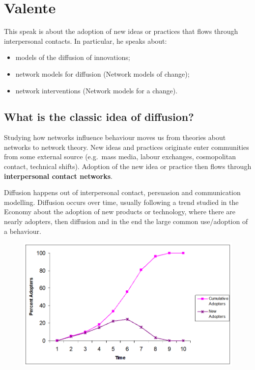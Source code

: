 \documentclass[
  notitlepage,
  onecolumn,
  openany]{book}
\providecommand{\tightlist}{%
  \setlength{\itemsep}{0pt}\setlength{\parskip}{0pt}}
\begin{document}
\hypertarget{valente}{%
\section{Valente}\label{valente}}

This speak is about the adoption of new ideas or practices that flows through interpersonal contacts. In particular, he speaks about:

\begin{itemize}
\tightlist
\item
  models of the diffusion of innovations;
\item
  network models for diffusion (Network models of change);
\item
  network interventions (Network models for a change).
\end{itemize}

\hypertarget{what-is-the-classic-idea-of-diffusion}{%
\subsection{What is the classic idea of diffusion?}\label{what-is-the-classic-idea-of-diffusion}}

Studying how networks influence behaviour moves us from theories about networks to network theory. New ideas and practices originate enter communities from some external source (e.g.~mass media, labour exchanges, cosmopolitan contact, technical shifts). Adoption of the new idea or practice then flows through \textbf{interpersonal contact networks}.

Diffusion happens out of interpersonal contact, persuasion and communication modelling. Diffusion occurs over time, usually following a trend studied in the Economy about the adoption of new products or technology, where there are nearly adopters, then diffusion and in the end the large common use/adoption of a behaviour.

\begin{figure}[h!]

{\centering \includegraphics[width=0.5\linewidth]{images/14-Christakis and Valente/Untitled 1} 

}

\end{figure}
\end{document}
